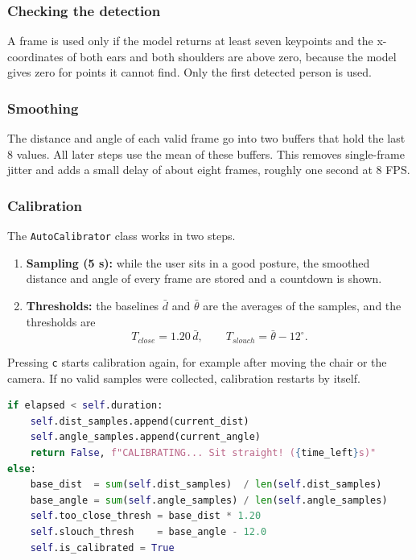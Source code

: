 ﻿\documentclass[12pt,a4paper]{article}
\begin{document}
\subsubsection{Checking the detection}
A frame is used only if the model returns at least seven keypoints and the x-coordinates of
both ears and both shoulders are above zero, because the model gives zero for points it
cannot find. Only the first detected person is used.

\subsubsection{Smoothing}
The distance and angle of each valid frame go into two buffers that hold the last 8 values.
All later steps use the mean of these buffers. This removes single-frame jitter and adds a
small delay of about eight frames, roughly one second at 8 FPS.

\subsubsection{Calibration}
The \texttt{AutoCalibrator} class works in two steps.
\begin{enumerate}
    \item \textbf{Sampling (5 s):} while the user sits in a good posture, the smoothed
          distance and angle of every frame are stored and a countdown is shown.
    \item \textbf{Thresholds:} the baselines $\bar d$ and $\bar\theta$ are the averages of
          the samples, and the thresholds are
          \begin{equation}
          T_{close} = 1.20\,\bar d, \qquad T_{slouch} = \bar\theta - 12^\circ .
          \end{equation}
\end{enumerate}
Pressing \texttt{c} starts calibration again, for example after moving the chair or the
camera. If no valid samples were collected, calibration restarts by itself.

\begin{lstlisting}[language=Python, caption={Threshold calculation in AutoCalibrator}, label=lst:calibration]
if elapsed < self.duration:
    self.dist_samples.append(current_dist)
    self.angle_samples.append(current_angle)
    return False, f"CALIBRATING... Sit straight! ({time_left}s)"
else:
    base_dist  = sum(self.dist_samples)  / len(self.dist_samples)
    base_angle = sum(self.angle_samples) / len(self.angle_samples)
    self.too_close_thresh = base_dist * 1.20
    self.slouch_thresh    = base_angle - 12.0
    self.is_calibrated = True
\end{lstlisting}
\end{document}
